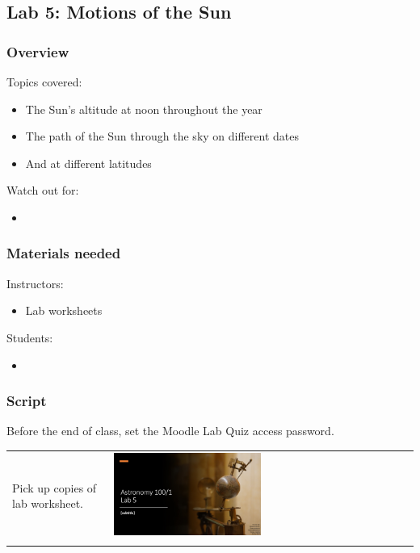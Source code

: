 \documentclass[12pt]{article}
\begin{document}
\newpage
\subsection{Lab 5: Motions of the Sun}

\subsubsection{Overview}

Topics covered:
\begin{itemize}
\item The Sun’s altitude at noon throughout the year
\item The path of the Sun through the sky on different dates \item And at different latitudes
\end{itemize}

\noindent
Watch out for:
\begin{itemize}
\item 
\end{itemize}


\subsubsection{Materials needed}

Instructors:
\begin{itemize}
\item Lab worksheets
\end{itemize}

\noindent
Students:
\begin{itemize}
\item 
\end{itemize}


\subsubsection{Script}

Before the end of class, set the Moodle Lab Quiz access password.

\begin{longtable}{m{}m{}}
Pick up copies of lab worksheet. & \includegraphics[width=0.5\textwidth]{ppt/lab05/Slide1.jpeg}\\

\label{default}
\end{longtable}
\end{document}
